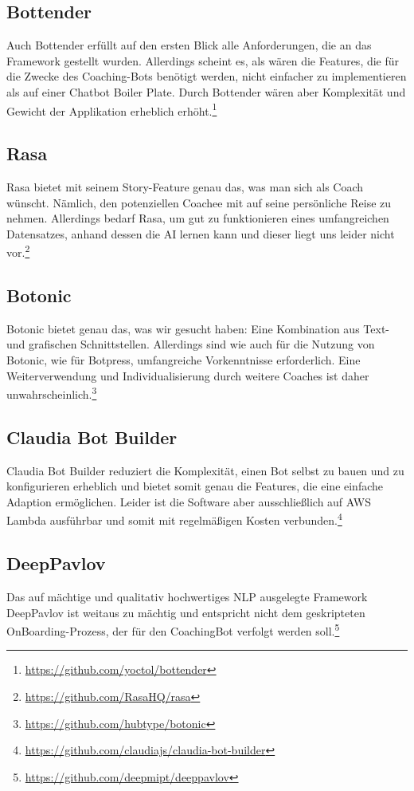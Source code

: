         \subsection{Bottender} 
            Auch Bottender erfüllt auf den ersten Blick alle Anforderungen, die an das Framework gestellt wurden. Allerdings scheint es, als wären die Features, die für die Zwecke des Coaching-Bots benötigt werden, nicht einfacher zu implementieren als auf einer Chatbot Boiler Plate. Durch Bottender wären aber Komplexität und Gewicht der Applikation erheblich erhöht.\footnote{\url{https://github.com/yoctol/bottender}}

        \subsection{Rasa} 
            Rasa bietet mit seinem Story-Feature genau das, was man sich als Coach wünscht. Nämlich, den potenziellen Coachee mit auf seine persönliche Reise zu nehmen. Allerdings bedarf Rasa, um gut zu funktionieren eines umfangreichen Datensatzes, anhand dessen die AI lernen kann und dieser liegt uns leider nicht vor.\footnote{\url{https://github.com/RasaHQ/rasa}}
            
        \subsection{Botonic} 
            Botonic bietet genau das, was wir gesucht haben: Eine Kombination aus Text- und grafischen Schnittstellen. Allerdings sind wie auch für die Nutzung von Botonic, wie für Botpress, umfangreiche Vorkenntnisse erforderlich. Eine Weiterverwendung und Individualisierung durch weitere Coaches ist daher unwahrscheinlich.\footnote{\url{https://github.com/hubtype/botonic}}
            
        \subsection{Claudia Bot Builder} 
          Claudia Bot Builder reduziert die Komplexität, einen Bot selbst zu bauen und zu konfigurieren erheblich und bietet somit genau die Features, die eine einfache Adaption ermöglichen. Leider ist die Software aber ausschließlich auf AWS Lambda ausführbar und somit mit regelmäßigen Kosten verbunden.\footnote{\url{https://github.com/claudiajs/claudia-bot-builder}}

        \subsection{DeepPavlov} 
            Das auf mächtige und qualitativ hochwertiges NLP ausgelegte Framework DeepPavlov ist weitaus zu mächtig und entspricht nicht dem geskripteten OnBoarding-Prozess, der für den CoachingBot verfolgt werden soll.\footnote{\url{https://github.com/deepmipt/deeppavlov}}
        
